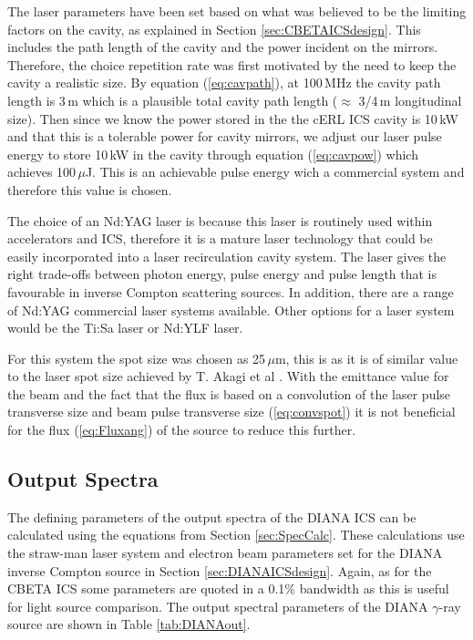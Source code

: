 \documentclass[11pt]{article}
\begin{document}
The laser parameters have been set based on what was believed to be the limiting factors on the cavity, as explained in Section \ref{sec:CBETAICSdesign}. This includes the path length of the cavity and the power incident on the mirrors. Therefore, the choice repetition rate was first motivated by the need to keep the cavity a realistic size. By equation (\ref{eq:cavpath}), at 100\,MHz the cavity path length is 3\,m which is a plausible total cavity path length ($\approx$ 3/4\,m longitudinal size). Then since we know the power stored in the the cERL ICS cavity is 10\,kW \cite{TAkagicERL} and that this is a tolerable power for cavity mirrors, we adjust our laser pulse energy to store 10\,kW in the cavity through equation (\ref{eq:cavpow}) which achieves 100\,$\mu$J. This is an achievable pulse energy wich a commercial system and therefore this value is chosen.

The choice of an Nd:YAG laser is because this laser is routinely used within accelerators and ICS, therefore it is a mature laser technology that could be easily incorporated into a laser recirculation cavity system. The laser gives the right trade-offs between photon energy, pulse energy and pulse length that is favourable in inverse Compton scattering sources. In addition, there are a range of Nd:YAG commercial laser systems available. Other options for a laser system would be the Ti:Sa laser or Nd:YLF laser. 

For this system the spot size was chosen as 25\,$\mu$m, this is as it is of similar value to the laser spot size achieved by T. Akagi et al \cite{TAkagicERL}. With the emittance value for the beam and the fact that the flux is based on a convolution of the laser pulse transverse size and beam pulse transverse size (\ref{eq:convspot}) it is not beneficial for the flux (\ref{eq:Fluxang}) of the source to reduce this further.       

\subsection{Output Spectra}

The defining parameters of the output spectra of the DIANA ICS can be calculated using the equations from Section \ref{sec:SpecCalc}. These calculations use the straw-man laser system and electron beam parameters set for the DIANA inverse Compton source in Section \ref{sec:DIANAICSdesign}. Again, as for the CBETA ICS some parameters are quoted in a 0.1\% bandwidth as this is useful for light source comparison. The output spectral parameters of the DIANA $\gamma$-ray source are shown in Table \ref{tab:DIANAout}.
\end{document}
